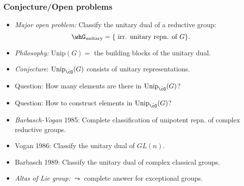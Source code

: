 \documentclass[t,mathserif,11pt,usenames,dvipsnames]{beamer}
\theoremstyle{plain}
\theoremstyle{definition}
\def\Sp{{\mathrm{Sp}}}
\def\Unip{{\mathrm{Unip}}}
\def\ckcO{{\check{\cO}}}
\def\blue{\color{blue}}
\def\red{\color{red}}
\def\lblue{\color{blue}}
\let\oldemph\emph
\def\emph#1{\oldemph{\blue #1}}
\begin{document}
    
    \begin{frame}[label=DU]
        \frametitle{Conjecture/Open problems}
        \begin{itemize}[<+->]
            \item \emph{Major open problem:} Classify the {\red unitary dual} of a reductive group:  
            \[\whG_{\text{unitary}} = \{\text{ irr. unitary repn. of }G \}. 
            \]
            \item \emph{Philosophy:} $\Unip(G)=$  the {\color{red} building blocks} of the unitary dual.  
            \item \emph{Conjecture}: $\Unip_{\ckcO}(G)$ consists of {\red unitary} representations.
            \item {\red Question:} How many elements are there in $\Unip_{\ckcO}(G)$?
            \item {\red Question:} How to construct elements in $\Unip_{\ckcO}(G)$?
            \item \emph{Barbasch-Vogan} 1985: Complete classification of unipotent repn. of {\lblue complex reductive groups}. 
            \item Vogan 1986: Classify the unitary dual of {\lblue $GL(n)$}. 
            \item Barbasch 1989: Classify the unitary dual of {\lblue complex classical groups}. 
            \item \emph{Altas of Lie group:} $\leadsto$ complete answer for exceptional groups. 
        \end{itemize}
    \end{frame}
  
    
\end{document}
